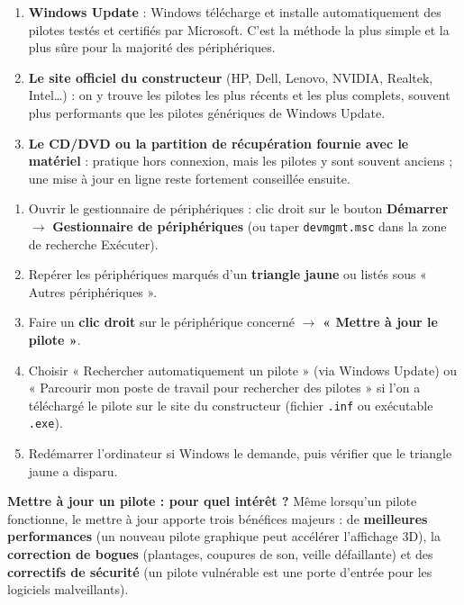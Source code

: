 \documentclass[11pt]{article}
\begin{document}
\begin{enumerate}
  \item \textbf{Windows Update} : Windows télécharge et installe automatiquement des pilotes testés et certifiés par Microsoft. C'est la méthode la plus simple et la plus sûre pour la majorité des périphériques.
  \item \textbf{Le site officiel du constructeur} (HP, Dell, Lenovo, NVIDIA, Realtek, Intel\ldots) : on y trouve les pilotes les plus récents et les plus complets, souvent plus performants que les pilotes génériques de Windows Update.
  \item \textbf{Le CD/DVD ou la partition de récupération fournie avec le matériel} : pratique hors connexion, mais les pilotes y sont souvent anciens ; une mise à jour en ligne reste fortement conseillée ensuite.
\end{enumerate}

\begin{methode}
\begin{enumerate}
  \item Ouvrir le gestionnaire de périphériques : clic droit sur le bouton \textbf{Démarrer} $\rightarrow$ \textbf{Gestionnaire de périphériques} (ou taper \texttt{devmgmt.msc} dans la zone de recherche Exécuter).
  \item Repérer les périphériques marqués d'un \textbf{triangle jaune} ou listés sous « Autres périphériques ».
  \item Faire un \textbf{clic droit} sur le périphérique concerné $\rightarrow$ \textbf{« Mettre à jour le pilote »}.
  \item Choisir « Rechercher automatiquement un pilote » (via Windows Update) ou « Parcourir mon poste de travail pour rechercher des pilotes » si l'on a téléchargé le pilote sur le site du constructeur (fichier \texttt{.inf} ou exécutable \texttt{.exe}).
  \item Redémarrer l'ordinateur si Windows le demande, puis vérifier que le triangle jaune a disparu.
\end{enumerate}
\end{methode}

\textbf{Mettre à jour un pilote : pour quel intérêt ?} Même lorsqu'un pilote fonctionne, le mettre à jour apporte trois bénéfices majeurs : de \textbf{meilleures performances} (un nouveau pilote graphique peut accélérer l'affichage 3D), la \textbf{correction de bogues} (plantages, coupures de son, veille défaillante) et des \textbf{correctifs de sécurité} (un pilote vulnérable est une porte d'entrée pour les logiciels malveillants).
\end{document}
